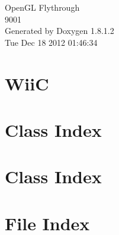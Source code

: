 \documentclass{book}
\begin{document}
\hypersetup{pageanchor=false,citecolor=blue}
\begin{titlepage}
\vspace*{7cm}
\begin{center}
{\Large Open\-G\-L Flythrough \\[1ex]\large 9001 }\\
\vspace*{1cm}
{\large Generated by Doxygen 1.8.1.2}\\
\vspace*{0.5cm}
{\small Tue Dec 18 2012 01:46:34}\\
\end{center}
\end{titlepage}
\clearemptydoublepage
{}
\tableofcontents
\clearemptydoublepage
{}
\hypersetup{pageanchor=true,citecolor=blue}
\chapter{Wii\-C}
\label{index}\hypertarget{index}{}
\chapter{Class Index}

\chapter{Class Index}

\chapter{File Index}

\end{document}
